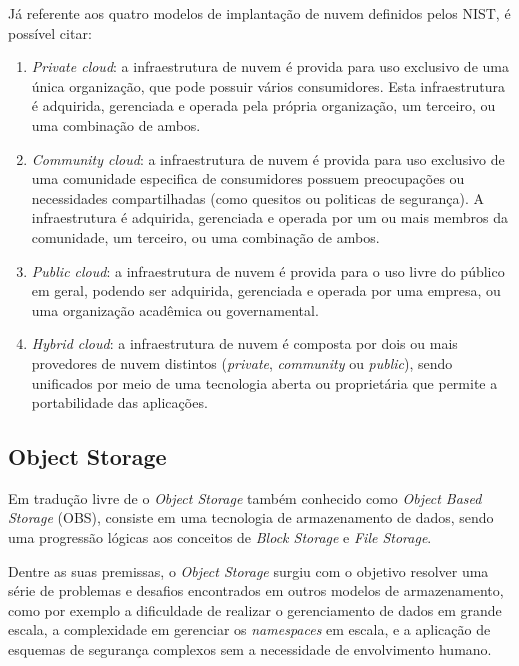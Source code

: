 Já referente aos quatro modelos de implantação de nuvem definidos pelos NIST, é possível citar:
\begin{enumerate}
    \item \emph{Private cloud}: a infraestrutura de nuvem é provida para uso
          exclusivo de uma única organização, que pode possuir vários consumidores.
          Esta infraestrutura é adquirida, gerenciada e operada pela própria organização,
          um terceiro, ou uma combinação de ambos.

    \item \emph{Community cloud}: a infraestrutura de nuvem é provida para uso
          exclusivo de uma comunidade especifica de consumidores possuem preocupações
          ou necessidades compartilhadas (como quesitos ou politicas de segurança).
          A infraestrutura é adquirida, gerenciada e operada por um ou mais membros
          da comunidade, um terceiro, ou uma combinação de ambos.

    \item \emph{Public cloud}: a infraestrutura de nuvem é provida para o uso
          livre do público em geral, podendo ser adquirida, gerenciada e operada por
          uma empresa, ou uma organização acadêmica ou governamental.

    \item \emph{Hybrid cloud}: a infraestrutura de nuvem é composta por dois ou mais
          provedores de nuvem distintos (\emph{private}, \emph{community} ou \emph{public}),
          sendo unificados por meio de uma tecnologia aberta ou proprietária que permite a
          portabilidade das aplicações.
\end{enumerate}

\subsection{Object Storage}

Em tradução livre de \cite{2020:Patil} o \emph{Object Storage} também conhecido
como \emph{Object Based Storage} (OBS), consiste em uma tecnologia de armazenamento
de dados, sendo uma progressão lógicas aos conceitos de \emph{Block Storage}
e \emph{File Storage}.

Dentre as suas premissas, o \emph{Object Storage} surgiu com o objetivo
resolver uma série de problemas e desafios encontrados em outros modelos de
armazenamento, como por exemplo a dificuldade de realizar o gerenciamento
de dados em grande escala, a complexidade em gerenciar os \emph{namespaces}
em escala, e a aplicação de esquemas de segurança complexos sem a necessidade
de envolvimento humano.

